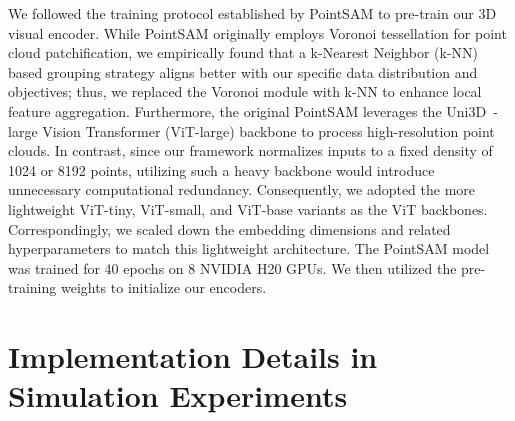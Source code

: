 \documentclass[runningheads]{llncs}
\begin{document}
We followed the training protocol established by PointSAM\cite{zhou2024point} to pre-train our 3D visual encoder. While PointSAM originally employs Voronoi tessellation for point cloud patchification, we empirically found that a k-Nearest Neighbor (k-NN) based grouping strategy aligns better with our specific data distribution and objectives; thus, we replaced the Voronoi module with k-NN to enhance local feature aggregation. Furthermore, the original PointSAM leverages the Uni3D~\cite{zhou2023uni3d}-large Vision Transformer (ViT-large) backbone to process high-resolution point clouds. In contrast, since our framework normalizes inputs to a fixed density of 1024 or 8192 points, utilizing such a heavy backbone would introduce unnecessary computational redundancy. Consequently, we adopted the more lightweight ViT-tiny, ViT-small, and ViT-base variants as the ViT backbones. Correspondingly, we scaled down the embedding dimensions and related hyperparameters to match this lightweight architecture. The PointSAM model was trained for 40 epochs on 8 NVIDIA H20 GPUs. We then utilized the pre-training weights to initialize our encoders.

\section{Implementation Details in Simulation Experiments}
\end{document}
